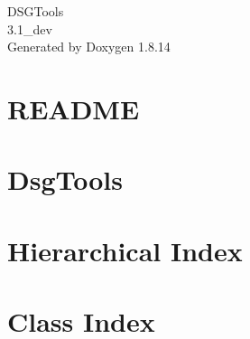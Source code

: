 \documentclass[twoside]{book}
\newcommand{\+}{\discretionary{\mbox{\scriptsize$\hookleftarrow$}}{}{}}
\newcommand{\clearemptydoublepage}{%
  \newpage{\pagestyle{empty}\cleardoublepage}%
}
\begin{document}
\hypersetup{pageanchor=false,
             bookmarksnumbered=true,
             pdfencoding=unicode
            }
\begin{titlepage}
\vspace*{7cm}
\begin{center}%
{\Large D\+S\+G\+Tools \\[1ex]\large 3.\+1\+\_\+dev }\\
\vspace*{1cm}
{\large Generated by Doxygen 1.8.14}\\
\end{center}
\end{titlepage}
\clearemptydoublepage
{}
\tableofcontents
\clearemptydoublepage
{}
\hypersetup{pageanchor=true}

\chapter{R\+E\+A\+D\+ME}
\label{md___users_luiz__8qgis2_python_plugins__dsg_tools_ext_dep_postgisaddon__r_e_a_d_m_e}

\chapter{Dsg\+Tools}
\label{md___users_luiz__8qgis2_python_plugins__dsg_tools__r_e_a_d_m_e}

\chapter{Hierarchical Index}

\chapter{Class Index}

\end{document}
